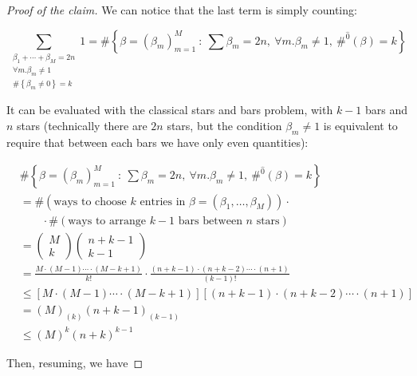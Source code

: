 \begin{proof}[Proof of the claim]
		We can notice that the last term is simply counting:
		
		\begin{equation*}
			\sum_{\substack{
					\beta_1 + \cdots + \beta_{M} =2n
					\\
					\forall m. \beta_m \neq 1
					\\
					\# \left\{ \beta_m \neq 0 \right\}  = k
			}} 1
			=
			\# \left\{
			\beta = (\beta_m)_{m=1}^{M} \ 
			:\
			\sum \beta_m = 2n, \
			\forall m. \beta_m \neq 1, \
			\#^{\widehat{0}} (\beta ) = k
			\right\}
		\end{equation*}
		
		It can be evaluated with the classical stars and bars problem, with $k -1$ bars and $n$ stars (technically there are $2n$ stars, but the condition $\beta_m \neq 1$ is equivalent to require that between each bars we have only even quantities):
		
		\begin{align*}
			&\# \left\{
			\beta = (\beta_m)_{m=1}^{M} \
			:\
			\sum \beta_m = 2n, \
			\forall m. \beta_m \neq 1, \
			\#^{\widehat{0}} (\beta ) = k
			\right\} 
			\\
			&= \# \left(
			\text{ways to choose $k$ entries in $\beta = (\beta_1, \ldots, \beta_{M})$}
			\right) \cdot
			\\
			&\qquad
			\cdot
			\# \left(
			\text{ways to arrange $k-1$ bars between $n$ stars}
			\right)
			\\
			& =
			\left(
			\begin{gathered}
				M
				\\
				k
			\end{gathered}
			\right)
			\left(
			\begin{gathered}
				n + k -1
				\\
				k - 1
			\end{gathered}
			\right)
			\\
			&=
			\frac{M \cdot (M -1)\cdots  \cdot (M -k +1)}{k!} \cdot \frac{(n +k -1) \cdot (n +k -2)\cdots \cdot (n + 1)}{(k-1)!}
			\\
			& \leq
			\left[ M \cdot (M -1)\cdots  \cdot (M -k +1)\right]
			\left[ (n +k -1) \cdot (n +k -2)\cdots \cdot (n + 1)\right]
			\\
			&= (M)_{(k)} (n +k -1)_{(k-1)}
			\\
			&\leq
			(M)^k  (n +k)^{k-1}
		\end{align*}
		
		Then, resuming, we have
		

\end{proof}
